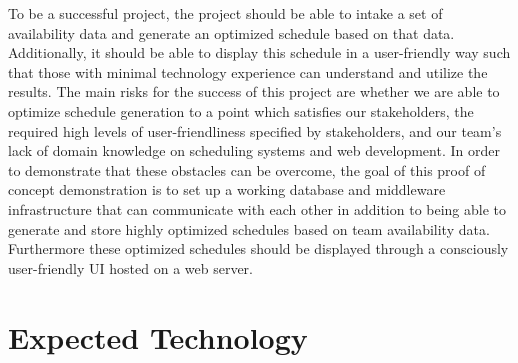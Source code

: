 \documentclass{article}
\begin{document}
To be a successful project, the project should be able to intake a set of 
availability data and generate an optimized schedule based on that data. 
Additionally, it should be able to display this schedule in a user-friendly 
way such that those with minimal technology experience can understand and 
utilize the results. The main risks for the success of this project are whether 
we are able to optimize schedule generation to a point which satisfies our 
stakeholders, the required high levels of user-friendliness specified by 
stakeholders, and our team's lack of domain knowledge on scheduling systems 
and web development. In order to demonstrate that these obstacles can be 
overcome, the goal of this proof of concept demonstration is to set up a 
working database and middleware infrastructure that can communicate with 
each other in addition to being able to generate and store highly optimized 
schedules based on team availability data. Furthermore these optimized 
schedules should be displayed through a consciously user-friendly UI hosted 
on a web server. 

\section{Expected Technology}
\end{document}
